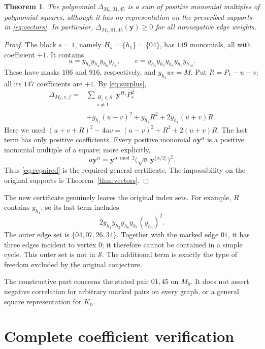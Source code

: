 \documentclass[11pt,a4paper]{article}
\newtheorem{theorem}{Theorem}
\newcommand{\SSS}{\mathcal S}
\begin{document}
\begin{theorem}\label{thm:separation}
The polynomial $\Delta_{M_8,01,45}$ is a sum of positive monomial
multiples of polynomial squares, although it has no representation
on the prescribed supports in \eqref{eq:vectors}.
In particular, $\Delta_{M_8,01,45}(\boldsymbol y)\ge0$ for all
nonnegative edge weights.
\end{theorem}
\begin{proof}
The block $s=1$, namely $H_s=\{h_1\}=\{04\}$, has $149$
monomials, all with coefficient $+1$. It contains
\[
 u=y_{h_2}y_{h_4}y_{h_6}y_{h_7},\qquad
 v=y_{h_3}y_{h_5}y_{h_8}y_{h_9}y_{h_{10}}.
\]
These have masks $106$ and $916$, respectively, and
$y_{h_1}uv=M$. Put $R=P_1-u-v$; all its $147$ coefficients
are $+1$. By \eqref{eq:surplus},
\begin{equation}\label{eq:repaired}
\begin{aligned}
 \Delta_{M_8,e,f}={}&
 \sum_{\substack{H_s\in\SSS\\s\ne1}}
       \boldsymbol y^{H_s}P_s^2\\
 &+y_{h_1}(u-v)^2+y_{h_1}R^2+2y_{h_1}(u+v)R.
\end{aligned}
\end{equation}
Here we used $(u+v+R)^2-4uv=(u-v)^2+R^2+2(u+v)R$.
The last term has only positive coefficients. Every positive
monomial $a\boldsymbol y^\alpha$ is a positive monomial multiple
of a square; more explicitly,
\[
 a\boldsymbol y^\alpha=
 \boldsymbol y^{\alpha\bmod2}
   \bigl(\sqrt a\,\boldsymbol y^{\lfloor\alpha/2\rfloor}\bigr)^2.
\]
Thus \eqref{eq:repaired} is the required general certificate.
The impossibility on the original supports is
Theorem~\ref{thm:vectors}.
\end{proof}

The new certificate genuinely leaves the original index sets.
For example, $R$ contains $y_{h_4}$, so its last term includes
\[
 2y_{h_1}y_{h_2}y_{h_6}y_{h_7}(y_{h_4})^2.
\]
The outer edge set is $\{04,07,26,34\}$. Together with the
marked edge $01$, it has three edges incident to vertex $0$;
it therefore cannot be contained in a simple cycle. This outer
set is not in $\SSS$. The additional term is exactly the type
of freedom excluded by the original conjecture.

The constructive part concerns the stated pair $01,45$ on $M_8$.
It does not assert negative correlation for arbitrary marked
pairs on every graph, or a general square representation for $K_n$.

\section{Complete coefficient verification}\label{sec:verification}
\end{document}
